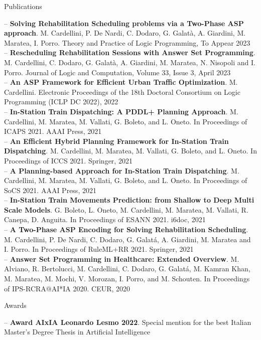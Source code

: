 \documentclass{resume} %
\begin{document}
\begin{rSection}{Publications}

-- \textbf{Solving Rehabilitation Scheduling problems via a Two-Phase ASP approach}. M. Cardellini, P. De Nardi, C. Dodaro, G. Galat\`a, A. Giardini, M. Maratea, I. Porro. Theory and Practice of Logic Programming, To Appear 2023 \\
-- \textbf{Rescheduling Rehabilitation Sessions with Answer Set Programming}. M. Cardellini, C. Dodaro, G. Galat\`a, A. Giardini, M. Maratea, N. Nisopoli and I. Porro. Journal of Logic and Computation, Volume 33, Issue 3, April 2023\\
-- \textbf{An ASP Framework for Efficient Urban Traffic Optimization}. M. Cardellini. Electronic Proceedings of the 18th Doctoral Consortium on Logic Programming (ICLP DC 2022), 2022 \\
-- \textbf{In-Station Train Dispatching: A PDDL+ Planning Approach}. M. Cardellini, M. Maratea, M. Vallati, G. Boleto, and L. Oneto. In Proceedings of ICAPS 2021. AAAI Press, 2021 \\
-- \textbf{An Efficient Hybrid Planning Framework for In-Station Train Dispatching}. M. Cardellini, M. Maratea, M. Vallati, G. Boleto, and L. Oneto. In Proceedings of ICCS 2021. Springer, 2021 \\
-- \textbf{A Planning-based Approach for In-Station Train Dispatching}. M. Cardellini, M. Maratea, M. Vallati, G. Boleto, and L. Oneto. In Proceedings of SoCS 2021. AAAI Press, 2021\\
-- \textbf{In-Station Train Movements Prediction: from Shallow to Deep Multi Scale Models}. G. Boleto, L. Oneto, M. Cardellini, M. Maratea, M. Vallati, R. Canepa, D. Anguita. In Proceedings of ESANN 2021. i6doc, 2021\\
-- \textbf{A Two-Phase ASP Encoding for Solving Rehabilitation Scheduling}. M. Cardellini, P. De Nardi, C. Dodaro, G. Galat\'a, A. Giardini, M. Maratea and I. Porro. In Proceedings of RuleML+RR 2021. Springer, 2021\\
-- \textbf{Answer Set Programming in Healthcare: Extended Overview}. M. Alviano, R. Bertolucci, M. Cardellini, C. Dodaro, G. Galat\'a, M. Kamran Khan, M. Maratea, M. Mochi, V. Morozan, I. Porro, and M. Schouten. In Proceedings of IPS-RCRA@AI*IA 2020. CEUR, 2020
\end{rSection}

\begin{rSection}{Awards}

-- \textbf{Award AIxIA Leonardo Lesmo 2022}. Special mention for the best Italian Master's Degree Thesis in Artificial Intelligence
\end{rSection}
\end{document}

